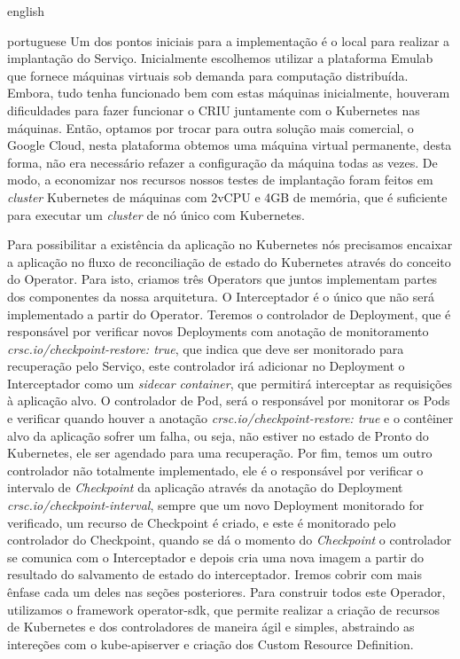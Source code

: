 \begin{otherlanguage*}{english}
\begin{otherlanguage*}{portuguese}
Um dos pontos iniciais para a implementação é o local para realizar a implantação do
Serviço. Inicialmente escolhemos utilizar a plataforma Emulab \cite{White+:osdi02}
que fornece máquinas virtuais sob demanda para computação distribuída. Embora, tudo
tenha funcionado bem com estas máquinas inicialmente, houveram dificuldades para
fazer funcionar o CRIU juntamente com o Kubernetes nas máquinas. Então, optamos por
trocar para outra solução mais comercial, o Google Cloud, nesta plataforma obtemos
uma máquina virtual permanente, desta forma, não era necessário refazer a configuração
da máquina todas as vezes. De modo, a economizar nos recursos nossos testes de
implantação foram feitos em \textit{cluster} Kubernetes de máquinas com 2vCPU e 4GB
de memória, que é suficiente para executar um \textit{cluster} de nó único com Kubernetes.

Para possibilitar a existência da aplicação no Kubernetes nós precisamos encaixar a
aplicação no fluxo de reconciliação de estado do Kubernetes através do conceito do Operator.
Para isto, criamos três Operators que juntos implementam partes dos componentes da
nossa arquitetura. O Interceptador é o único que não será implementado a partir do Operator.
Teremos o controlador de Deployment, que é responsável por verificar novos Deployments
com anotação de monitoramento \textit{crsc.io/checkpoint-restore: true}, que indica que deve
ser monitorado para recuperação pelo Serviço, este controlador irá adicionar no Deployment
o Interceptador como um \textit{sidecar container}, que permitirá interceptar as requisições
à aplicação alvo. O controlador de Pod, será o responsável por monitorar os Pods e
verificar quando houver a anotação \textit{crsc.io/checkpoint-restore: true} e o contêiner
alvo da aplicação sofrer um falha, ou seja, não estiver no estado de Pronto do Kubernetes,
ele ser agendado para uma recuperação. Por fim, temos um outro controlador não totalmente
implementado, ele é o responsável por verificar o intervalo de \textit{Checkpoint} da
aplicação através da anotação do Deployment \textit{crsc.io/checkpoint-interval}, sempre
que um novo Deployment monitorado for verificado, um recurso de Checkpoint é criado, e este
é monitorado pelo controlador do Checkpoint, quando se dá o momento do \textit{Checkpoint}
o controlador se comunica com o Interceptador e depois cria uma nova imagem a partir do
resultado do salvamento de estado do interceptador. Iremos cobrir com mais ênfase cada um
deles nas seções posteriores. Para construir todos este Operador, utilizamos o framework
operator-sdk, que permite realizar a criação de recursos de Kubernetes e dos controladores
de maneira ágil e simples, abstraindo as intereções com o kube-apiserver e criação dos
Custom Resource Definition.


\end{otherlanguage*}
\end{otherlanguage*}
